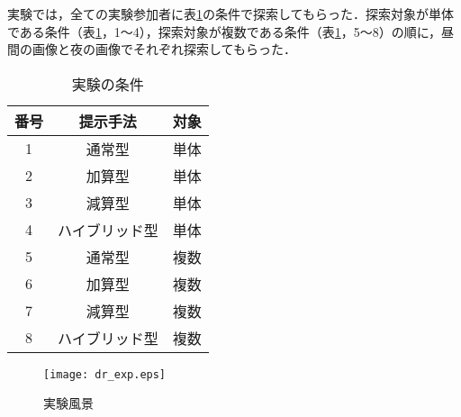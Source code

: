   実験では，全ての実験参加者に表\ref{tab:order}の条件で探索してもらった．探索対象が単体である条件（表\ref{tab:order}，1〜4），探索対象が複数である条件（表\ref{tab:order}，5〜8）の順に，昼間の画像と夜の画像でそれぞれ探索してもらった．

  \begin{table}[tb]
    \caption{実験の条件}
    \label{tab:order}
    \begin{center}
    \begin{tabular}{ccc}
      \hline\hline
      \textbf{番号} & \multicolumn{1}{c}{\textbf{提示手法}} & \textbf{対象} \\
      \hline
      1 & 通常型 & 単体 \\
      2 & 加算型 & 単体 \\
      3 & 減算型 & 単体 \\
      4 & ハイブリッド型 & 単体 \\
      \hline
      5 & 通常型 & 複数 \\
      6 & 加算型 & 複数 \\
      7 & 減算型 & 複数 \\
      8 & ハイブリッド型 & 複数 \\
      \hline
    \end{tabular}
  \end{center}
  \end{table}

  \begin{figure}[tb]
    \begin{center}
      \texttt{[image: dr\_exp.eps]}
      \caption{実験風景}
    \end{center}
    \label{fig:exp}
  \end{figure}

